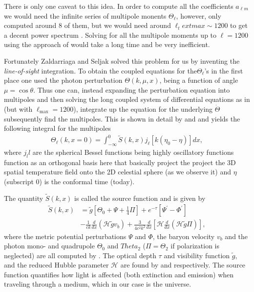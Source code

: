 \documentclass[twocolumn]{aastex62}
\begin{document}
There is only one caveat to this idea. In order to compute all the coefficients $a_{\ell m}$ we would need the infinite series of multipole monents $\Theta_\ell$, however, \cite{stutzer:2020c} only computed around 8 of them, but we would need around $\ell_text{max} \sim 1200$ to get a decent power spectrum \citep[]{winther:2020c}. Solving for all the multipole moments up to $\ell = 1200$ using the approach of \cite{stutzer:2020c} would take a long time and be very inefficient. 

Fortunately Zaldarriaga and Seljak solved this problem for us by inventing the \textit{line-of-sight} integration. To obtain the coupled equations for the$ \Theta_\ell$'s in the first place one used the photon perturbation $\Theta(k, \mu, x)$, being a function of angle $\mu = \cos \theta$. Thus one can, instead expanding the perturbation equation into multipoles and then solving the long coupled system of differential equations as in \cite{stutzer:2020c} (but with $\ell_\text{max} = 1200$), integrate up the equation for the underlying $\dot{\Theta}$ subsequently find the multipoles. This is shown in detail by \cite{callin:2006} and \cite{dodelson:2003} and yields the following integral for the multipoles 
\begin{align}
    \Theta_\ell(k, x=0) = \int_{-\infty}^{0} \tilde{S}(k,x)
              j_\ell[k(\eta_0-\eta)] dx,
\end{align} 
where $j_ll$ are the spherical Bessel functions being highly oscillatory functions function as an orthogonal basis here that basically project the project the 3D spatial temperature field onto the 2D celestial sphere (as we observe it) and $\eta$ (subscript 0) is the conformal time (today). 

The quantity $\tilde{S}(k,x)$ is called the source function and is given by
\begin{align}
    \tilde{S}(k,x) &= \tilde{g}\left[ \Theta_0 + \Psi + \frac{1}{4}\Pi\right] + e^{-\tau} \left[\Psi^\prime-\Phi^\prime\right] \nonumber\\
    &- \frac{1}{ck}\frac{d}{dx}(\mathcal{H}\tilde{g}v_b) + \frac{3}{4c^2k^2} \frac{d}{dx} \left[\mathcal{H}\frac{d}{dx} (\mathcal{H}\tilde{g}\Pi)\right],
    \label{eq:source}
\end{align}
where the metric potential perturbations $\Psi$ and $\Phi$, the baryon velocity $v_b$ and the photon mono- and quadrupole $\Theta_0$ and $Theta_2$ ($\Pi = \Theta_2$ if polarization is neglected) are all computed by \cite{stutzer:2020c}. The optical depth $\tau$ and visibility function $\tilde{g}$, and the reduced Hubble parameter $\mathcal{H}$ are found by \cite{stutzer:2020b} and \cite{stutzer:2020a} respectively. The source function quantifies how light is affected (both extinction and emission) when traveling through a medium, which in our case is the universe.
\end{document}
